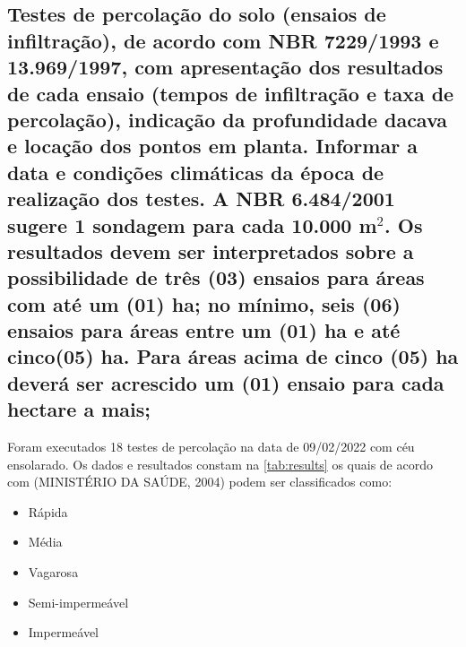 \subsection{Testes de percolação do solo (ensaios de infiltração), de acordo com NBR 7229/1993 e 13.969/1997, com apresentação dos resultados de cada ensaio (tempos de infiltração e taxa de percolação), indicação da profundidade dacava e locação dos pontos em planta. Informar a data e condições climáticas da época de realização dos testes. A NBR 6.484/2001 sugere 1 sondagem para cada 10.000 m$^2$. Os resultados devem ser interpretados sobre a possibilidade de três (03) ensaios para áreas com até um (01) ha; no mínimo, seis (06) ensaios para áreas entre um (01) ha e até cinco(05) ha. Para áreas acima de cinco (05) ha deverá ser acrescido um (01) ensaio para cada hectare a mais;}

Foram executados 18 testes de percolação na data de 09/02/2022 com céu 
ensolarado. Os dados e resultados constam na 
\cref{tab:results} os quais de acordo com (MINISTÉRIO DA SAÚDE, 2004) 
podem ser classificados
como: 

\begin{itemize}
	\item Rápida
	\item Média
	\item Vagarosa
	\item Semi-impermeável
	\item Impermeável
\end{itemize}

\renewcommand{\multirowsetup}{\centering}


